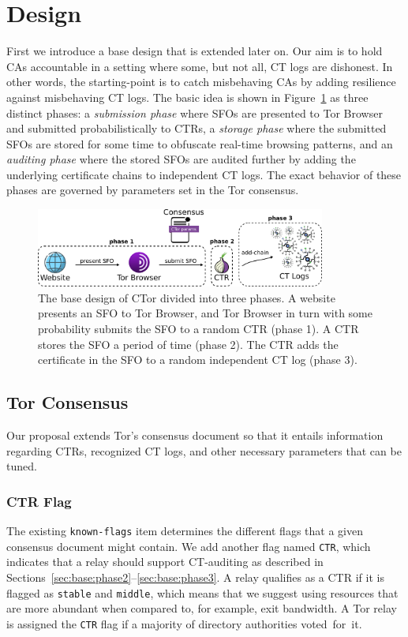 \section{Design} \label{sec:base}
First we introduce a base design that is extended later on.  Our aim is to hold
CAs accountable in a setting where some, but not all, CT logs are dishonest.  In
other words, the starting-point is to catch misbehaving CAs by adding resilience
against misbehaving CT logs.  The basic idea is shown in
Figure~\ref{fig:design-ca} as three distinct phases:
	a \emph{submission phase} where SFOs are presented to Tor Browser
		and submitted probabilistically to CTRs,
	a \emph{storage phase} where the submitted SFOs are stored for some time to
		obfuscate real-time browsing patterns, and
	an \emph{auditing phase} where the stored SFOs are audited further by adding
		the underlying certificate chains to independent CT logs.
The exact behavior of these phases are governed by parameters set in the Tor
consensus.

\begin{figure}
	\centering
	\includegraphics[width=0.85\textwidth]{img/design-ca}
	\caption{%
		The base design of CTor divided into three phases. A website presents an
		SFO to Tor Browser, and Tor Browser in turn with some probability
		submits the SFO to a random CTR (phase 1). A CTR stores the SFO a period
		of time (phase 2). The CTR adds the certificate in the SFO to a random
		independent CT log (phase 3).
	}
	\label{fig:design-ca}
\end{figure}

\subsection{Tor Consensus} \label{sec:base:consensus}
Our proposal extends Tor's consensus document
so that it entails information regarding
	CTRs,
	recognized CT logs, and
	other necessary parameters that can be tuned.

\subsubsection{CTR Flag} \label{sec:base:consensus:ctr-flag}
The existing \texttt{known-flags} item determines the different flags that a 
given consensus document might contain.  We add another flag named \texttt{CTR},
which indicates that a relay should support CT-auditing as described in
Sections~\ref{sec:base:phase2}--\ref{sec:base:phase3}.  A relay qualifies as a
CTR if it is flagged as \texttt{stable} and \texttt{middle}, which means that we
suggest using resources that are more abundant when compared to, for example,
exit bandwidth.  A Tor relay is assigned the \texttt{CTR} flag if a majority of
directory authorities voted~for~it.

